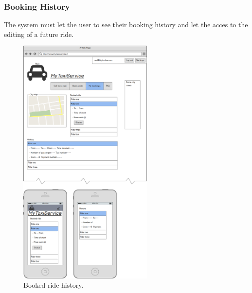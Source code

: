 		\subsubsection {Booking History}
			The system must let the user to see their booking history and let the acces to the editing of a future ride.
			\begin{figure}[h!]
				\includegraphics[width=0.6\textwidth]{mockup/history}
				\caption{Booked ride history.}
			\end{figure}
			\newpage
